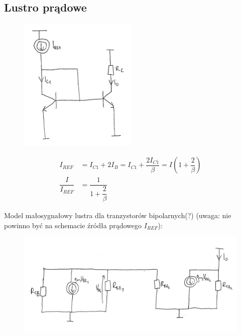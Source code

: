 \documentclass[10pt,a4paper]{article}
\begin{document}
\subsection{Lustro prądowe}
\begin{figure}[H]
\centering
\includegraphics[width=0.5\textwidth]{lustro}
\end{figure}
\begin{align*}
I_{REF}&=I_{C1}+2I_B=I_{C1}+\dfrac{2I_{C1}}{\beta}=I(1+\dfrac{2}{\beta}) \\
\dfrac{I}{I_{REF}}&=\dfrac{1}{1+\dfrac{2}{\beta}}
\end{align*}

Model małosygnałowy lustra dla tranzystorów bipolarnych(?) (uwaga: nie powinno być na schemacie źródła prądowego $I_{REF}$):
\begin{figure}[H]
\centering
\includegraphics[scale=0.8]{lustr_wyp1}
\end{figure}
\end{document}
